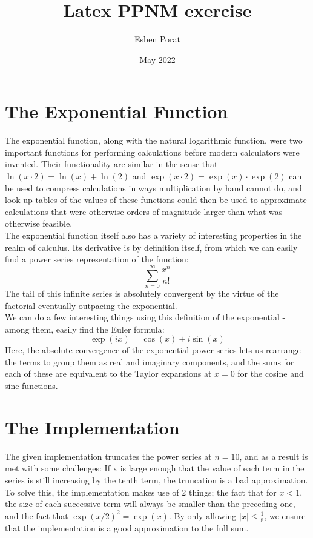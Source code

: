 \documentclass{article}
\title{Latex PPNM exercise}
\author{Esben Porat}
\date{May 2022}
\begin{document}
\maketitle

\section{The Exponential Function}
The exponential function, along with the natural logarithmic function, were two important functions for performing calculations before modern calculators were invented. Their functionality are similar in the sense that $\ln(x\cdot2) = \ln(x) + \ln(2)$ and $\exp(x\cdot2) = \exp(x) \cdot\exp(2)$ can be used to compress calculations in ways multiplication by hand cannot do, and look-up tables of the values of these functions could then be used to approximate calculations that were otherwise orders of magnitude larger than what was otherwise feasible.\\

The exponential function itself also has a variety of interesting properties in the realm of calculus. Its derivative is by definition itself, from which we can easily find a power series representation of the function:
$$\sum_{n=0}^{\infty} \frac{x^n}{n!}$$
The tail of this infinite series is absolutely convergent by the virtue of the factorial eventually outpacing the exponential.\\
We can do a few interesting things using this definition of the exponential - among them, easily find the Euler formula:
$$\exp(ix) = \cos(x) + i\sin(x)$$
Here, the absolute convergence of the exponential power series lets us rearrange the terms to group them as real and imaginary components, and the sums for each of these are equivalent to the Taylor expansions at $x=0$ for the cosine and sine functions.

\section{The Implementation}
The given implementation truncates the power series at $n=10$, and as a result is met with some challenges: If x is large enough that the value of each term in the series is still increasing by the tenth term, the truncation is a bad approximation. To solve this, the implementation makes use of 2 things; the fact that for $x < 1$, the size of each successive term will always be smaller than the preceding one, and the fact that $\exp(x / 2)^2 = \exp(x)$. By only allowing $|x|\leq \frac{1}{8}$, we ensure that the implementation is a good approximation to the full sum.\\
\end{document}
